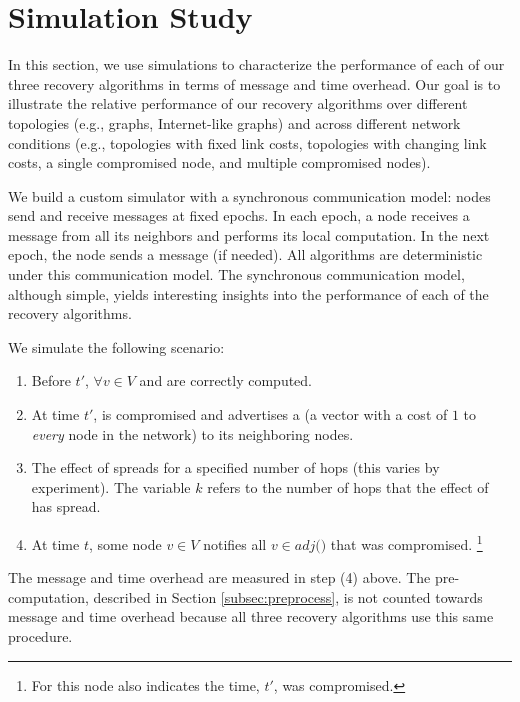 \section{Simulation Study}
\label{sec:eval}

In this section, we use simulations to characterize the performance of each of our three recovery algorithms in terms of message and time overhead. 
Our goal is to illustrate the relative performance of our recovery algorithms over different topologies (e.g., \er graphs, Internet-like graphs) and across
different network conditions (e.g., topologies with fixed link costs, topologies with changing link costs, a single compromised node, and multiple compromised nodes).

We build a custom simulator with a synchronous communication model: nodes send and receive messages at fixed epochs.  In each epoch, a node receives a
message from all its neighbors and performs its local computation.  In
the next epoch, the node sends a message (if needed).   All algorithms
are deterministic under this communication model.
The synchronous communication model, although simple, yields
interesting insights into the performance of each of the recovery algorithms. 

We simulate the following scenario:
\begin{enumerate}
	\item Before $t'$, $\forall v \in V$ \minvv and \dmatrixv are correctly computed.

	\item At time $t'$, \bad is compromised and advertises a \badvector (a vector with a cost of $1$ to \emph{every} node in the network) to its neighboring nodes.

	\item The effect of \badvector spreads for a specified number of hops (this varies by experiment).  The variable $k$ refers to the number of hops that the effect of \badvector has spread.

	\item At time $t$, some node $v \in V$ notifies all $v \in adj($\bads$)$ that \bad was compromised. 
	{\footnote { \small For \cpr this node also indicates the time, $t'$, \bad was compromised.}} 

\end{enumerate}
The message and time overhead are measured in step (4) above. The pre-computation, described in Section \ref{subsec:preprocess}, is not counted towards message and time overhead
because all three recovery algorithms use this same procedure.

